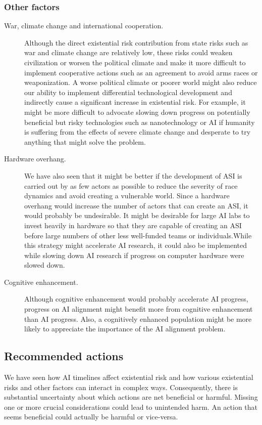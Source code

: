 \documentclass{article}
\begin{document}
\subsubsection{Other factors}

\begin{description}
\item[War, climate change and international cooperation.] Although the direct existential risk contribution from state risks such as war and climate change are relatively low, these risks could weaken civilization or worsen the political climate and make it more difficult to implement cooperative actions such as an agreement to avoid arms races or weaponization. A worse political climate or poorer world might also reduce our ability to implement differential technological development and indirectly cause a significant increase in existential risk. For example, it might be more difficult to advocate slowing down progress on potentially beneficial but risky technologies such as nanotechnology or AI if humanity is suffering from the effects of severe climate change and desperate to try anything that might solve the problem.
\item[Hardware overhang.] We have also seen that it might be better if the development of ASI is carried out by as few actors as possible to reduce the severity of race dynamics and avoid creating a vulnerable world. Since a hardware overhang would increase the number of actors that can create an ASI, it would probably be undesirable. It might be desirable for large AI labs to invest heavily in hardware so that they are capable of creating an ASI before large numbers of other less well-funded teams or individuals.While this strategy might accelerate AI research, it could also be implemented while slowing down AI research if progress on computer hardware were slowed down.
\item[Cognitive enhancement.] Although cognitive enhancement would probably accelerate AI progress, progress on AI alignment might benefit more from cognitive enhancement than AI progress. Also, a cognitively enhanced population might be more likely to appreciate the importance of the AI alignment problem.
\end{description}

\subsection{Recommended actions}

We have seen how AI timelines affect existential risk and how various existential risks and other factors can interact in complex ways. Consequently, there is substantial uncertainty about which actions are net beneficial or harmful. Missing one or more crucial considerations could lead to unintended harm. An action that seems beneficial could actually be harmful or vice-versa.
\end{document}
